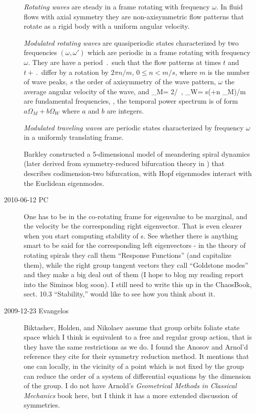 \begin{description}
\emph{Rotating waves} are steady
in a frame rotating with frequency $\omega$. In fluid flows with
axial symmetry they are non-axisymmetric flow patterns that
rotate as a rigid body with a uniform angular velocity.
                                    \toCB

\emph{Modulated rotating waves} are quasiperiodic states characterized
by two frequencies $(\omega,\omega')$ which are
periodic in a frame rotating with frequency $\omega$. They are
have
a period $\period{}$ such that the flow patterns
at times $t$ and $t+\period{}$ differ by a rotation by $2\pi n/m$,
$0 \leq n < m/s$,
where $m$ is the number of wave peaks, $s$ the order of
axisymmetry of the wave pattern, $\omega$ the average angular
velocity of the wave, and
                                    \toCB
\beq
\Omega_M= 2\pi /\period{}
	\,,\qquad
\Omega_W= s(\omega+n \Omega_M)/m
are fundamental frequencies, \ie, the temporal power spectrum
is of form $a\Omega_M+b \Omega_W$ where $a$ and $b$ are integers.

\emph{Modulated traveling wave}s are periodic states characterized
by frequency $\omega$ in a uniformly translating frame.

Barkley constructed a 5-dimensional model of meandering spiral dynamics
(later derived from symmetry-reduced bifurcation theory in
) that describes codimension-two bifurcation, with Hopf
eigenmodes interact with the Euclidean eigenmodes.

\item[2010-06-12 PC]                                            \toCB
One has to be in the co-rotating frame for eigenvalue to be marginal, and
the velocity be the corresponding right eigenvector. That is even clearer
when you start computing stability of \rpo s. See whether there is
anything smart to be said for the corresponding left eigenvectors - in
the theory of rotating spirals they call them ``Response Functions'' (and
capitalize them), while the right group tangent vectors they call
``Goldstone modes'' and they make a big deal out of them (I hope to blog
my reading report into the Siminos blog soon). I still need to write this
up in the ChaosBook, sect. 10.3 ``Stability,'' would like to see how you
think about it.


\item[2009-12-23 Evangelos]
Biktashev, Holden, and Nikolaev assume that group
orbits foliate state space which I think is equivalent to a
free and regular group action, that is they have the same
restrictions as we do.  I found the Anosov and Arnol'd reference
they cite for their symmetry reduction method. It mentions that
one can locally, in the vicinity of a point which is not fixed by
the group can reduce the order of a system of differential equations
by the dimension of the group. I do not have Arnold's \emph{Geometrical Methods
in Classical Mechanics} book here, but I think it has a more extended
discussion of symmetries.


\end{description}
